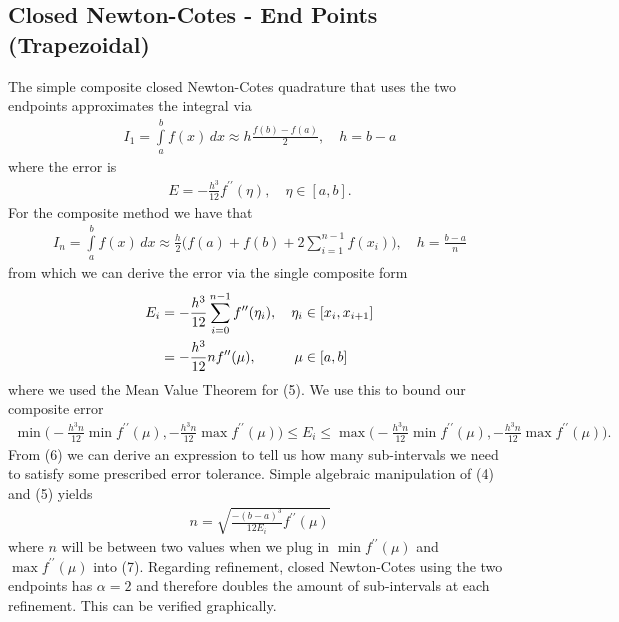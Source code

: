 \documentclass[12pt]{article}
\theoremstyle{remark}
\begin{document}
\newpage

\subsection{Closed Newton-Cotes - End Points (Trapezoidal)}

The simple composite closed Newton-Cotes quadrature that uses the two endpoints approximates the integral via
\begin{align}
I_1 = \displaystyle\int\limits_a^b f(x) \, dx \approx h\frac{f(b) - f(a)}{2}, \quad h = b - a
\end{align}
where the error is 
\begin{align}
E = -\frac{h^3}{12}f^{\prime\prime}(\eta), \quad \eta \in [a,b].
\end{align}
For the composite method we have that 
\begin{align}
I_n = \displaystyle\int\limits_a^b f(x) \, dx \approx \frac{h}{2}\bigg( f(a) + f(b) + 2\sum\limits_{i=1}^{n-1} f(x_i) \bigg), \quad h = \frac{b-a}{n}
\end{align}
from which we can derive the error via the single composite form 
\begin{align}
	E_i & = -\frac{h^3}{12}\sum\limits_{i=0}^{n-1} f^{\prime\prime}(\eta_i), \quad \eta_i \in [x_i, x_{i+1}] \\
	& = -\frac{h^3}{12}nf^{\prime\prime}(\mu), \quad \hskip 0.6cm \mu \in [a,b]
\end{align}
where we used the Mean Value Theorem for (5). We use this to bound our composite error 
\begin{align}
	\min\bigg(-\frac{h^3n}{12}\min f^{\prime\prime}(\mu),-\frac{h^3n}{12}\max f^{\prime\prime}(\mu) \bigg) \leq E_i \leq \max\bigg(-\frac{h^3n}{12}\min f^{\prime\prime}(\mu),-\frac{h^3n}{12}\max f^{\prime\prime}(\mu) \bigg).
\end{align}
From (6) we can derive an expression to tell us how many sub-intervals we need to satisfy some prescribed error tolerance. Simple algebraic manipulation of (4) and (5) yields
\begin{align}
	n = \sqrt{\frac{-(b-a)^3}{12E_i}f^{\prime\prime}(\mu)}
\end{align}
where $n$ will be between two values when we plug in $\min f^{\prime\prime}(\mu)$ and $\max f^{\prime\prime}(\mu)$ into (7).
Regarding refinement, closed Newton-Cotes using the two endpoints has $\alpha = 2$ and therefore doubles the amount of sub-intervals at each refinement. This can be verified graphically.
\end{document}
